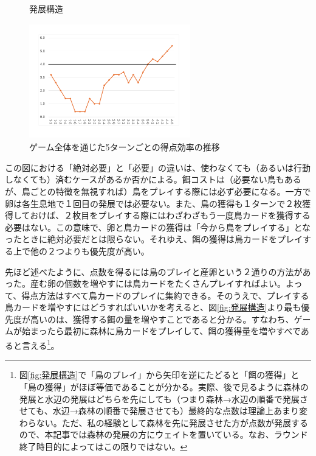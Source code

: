 \begin{multicols}{2}
\begin{figure}[htbp]
\begin{minipage}[b]{.5\textwidth}
  \caption{発展構造}
  \label{fig:発展構造}
\end{minipage}
\begin{minipage}[b]{.5\textwidth}
  \centering
  \includegraphics[height=5cm,width=7cm]{2025shinki/wing_span/WS_tokutennkouritu.pdf}
  \caption{ゲーム全体を通じた5ターンごとの得点効率の推移}
  \label{fig:得点効率}
\end{minipage}
\end{figure}
この図における「絶対必要」と「必要」の違いは、使わなくても（あるいは行動しなくても）済むケースがあるか否かによる。餌コストは（必要ない鳥もあるが、鳥ごとの特徴を無視すれば）鳥をプレイする際には必ず必要になる。一方で卵は各生息地で１回目の発展では必要ない。また、鳥の獲得も１ターンで２枚獲得しておけば、２枚目をプレイする際にはわざわざもう一度鳥カードを獲得する必要はない。この意味で、卵と鳥カードの獲得は「今から鳥をプレイする」となったときに絶対必要だとは限らない。それゆえ、餌の獲得は鳥カードをプレイする上で他の２つよりも優先度が高い。
\par
先ほど述べたように、点数を得るには鳥のプレイと産卵という２通りの方法があった。産む卵の個数を増やすには鳥カードをたくさんプレイすればよい。よって、得点方法はすべて鳥カードのプレイに集約できる。そのうえで、プレイする鳥カードを増やすにはどうすればいいかを考えると、図\ref{fig:発展構造}より最も優先度が高いのは、獲得する餌の量を増やすことであると分かる。すなわち、ゲームが始まったら最初に森林に鳥カードをプレイして、餌の獲得量を増やすべであると言える\footnote{図\ref{fig:発展構造}で「鳥のプレイ」から矢印を逆にたどると「餌の獲得」と「鳥の獲得」がほぼ等価であることが分かる。実際、後で見るように森林の発展と水辺の発展はどちらを先にしても（つまり森林→水辺の順番で発展させても、水辺→森林の順番で発展させても）最終的な点数は理論上あまり変わらない。ただ、私の経験として森林を先に発展させた方が点数が発展するので、本記事では森林の発展の方にウェイトを置いている。なお、ラウンド終了時目的によってはこの限りではない。}。
\end{multicols}
